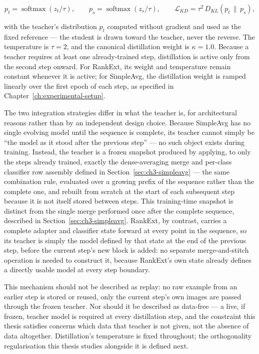\begin{equation}
\label{eq:ch3-kd}
p_t = \operatorname{softmax}(z_t/\tau), \qquad
p_s = \operatorname{softmax}(z_s/\tau), \qquad
\mathcal{L}_{KD} = \tau^2 \, D_{KL}(p_t \,\|\, p_s),
\end{equation}

with the teacher's distribution $p_t$ computed without gradient and used as
the fixed reference --- the student is drawn toward the teacher, never the
reverse. The temperature is $\tau=2$, and the canonical distillation weight
is $\kappa=1.0$. Because a teacher requires at least one already-trained
step, distillation is active only from the second step onward. For
RankExt, its weight and temperature remain constant whenever it is active;
for SimpleAvg, the distillation weight is ramped linearly over the first
epoch of each step, as specified in Chapter~\ref{ch:experimental-setup}.

The two integration strategies differ in what the teacher is, for
architectural reasons rather than by an independent design choice. Because
SimpleAvg has no single evolving model until the sequence is complete, its
teacher cannot simply be ``the model as it stood after the previous step'' ---
no such object exists during training. Instead, the teacher is a frozen
snapshot produced by applying, to only the steps already trained, exactly
the dense-averaging merge and per-class classifier row assembly defined in
Section~\ref{sec:ch3-simpleavg} --- the same combination rule, evaluated over a growing prefix
of the sequence rather than the complete one, and rebuilt from scratch at
the start of each subsequent step because it is not itself stored between
steps. This training-time snapshot is distinct from the single merge
performed once after the complete sequence, described in Section~\ref{sec:ch3-simpleavg}. RankExt, by contrast, carries a complete adapter and classifier state
forward at every point in the sequence, so its teacher is simply the model
defined by that state at the end of the previous step, before the current
step's new block is added: no separate merge-and-stitch operation is
needed to construct it, because RankExt's own state already defines a
directly usable model at every step boundary.

This mechanism should not be described as replay: no raw example from an
earlier step is stored or reused, only the current step's own images are
passed through the frozen teacher. Nor should it be described as
data-free --- a live, if frozen, teacher model is required at every
distillation step, and the constraint this thesis satisfies concerns which
data that teacher is not given, not the absence of data altogether.
Distillation's temperature is fixed throughout; the orthogonality
regularisation this thesis studies alongside it is defined next.

